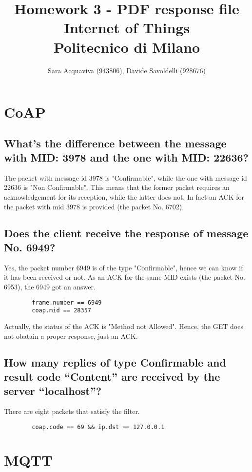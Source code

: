 \documentclass[12pt]{article}
\begin{document}
\title{%
  Homework 3 - PDF response file \\
  \large Internet of Things \\
  Politecnico di Milano \\
}

\author{Sara Acquaviva (943806), Davide Savoldelli (928676)}

\maketitle

\section{CoAP}
    \subsection{What’s the difference between the message with MID:
    3978 and the one with MID: 22636?}
    The packet with message id 3978 is "Confirmable", while the one with message id
    22636 is "Non Confirmable". This means that the former packet requires an acknowledgement for its reception,
    while the latter does not. In fact an ACK for the packet with mid 3978 is provided (the packet No. 6702).
    \subsection{Does the client receive the response of message No.
    6949?}
    Yes, the packet number 6949 is of the type "Confirmable", hence we can know if it has been received
    or not. As an ACK for the same MID exists (the packet No. 6953), the 6949 got an answer.
    \begin{lstlisting}
        frame.number == 6949
        coap.mid == 28357
    \end{lstlisting}
    Actually, the status of the ACK is "Method not Allowed". Hence, the GET does not 
    obatain a proper response, just an ACK.
    \subsection{How many replies of type Confirmable and result code
    “Content” are received by the server “localhost”?}
    There are eight packets that satisfy the filter.
    \begin{lstlisting}
        coap.code == 69 && ip.dst == 127.0.0.1
    \end{lstlisting}
\section{MQTT}
\end{document}
